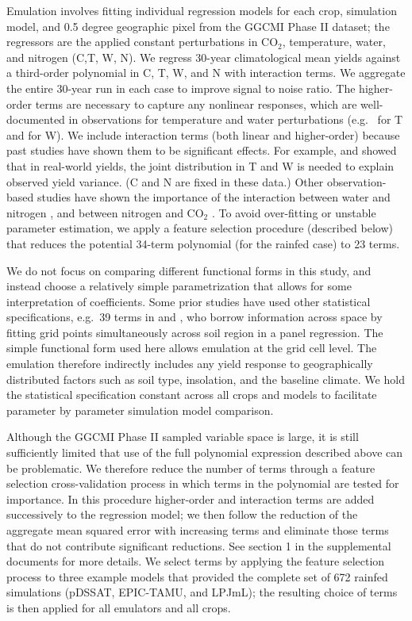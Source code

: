 \documentclass[esd, manuscript]{copernicus} %
\begin{document}
Emulation involves fitting individual regression models for each crop, simulation model, and 0.5 degree geographic pixel from the GGCMI Phase II dataset; the regressors are the applied constant perturbations in CO$_2$, temperature, water, and nitrogen (C,T, W, N).  We regress 30-year climatological mean yields against a third-order polynomial in C, T, W, and N with interaction terms. We aggregate the entire 30-year run in each case to improve signal to noise ratio. The higher-order terms are necessary to capture any nonlinear responses, which are well-documented in observations for temperature and water perturbations (e.g.\ \citet{Schlenker2009} for T and \citet{He2016} for W). We include interaction terms (both linear and higher-order) because past studies have shown them to be significant effects. For example, \citet{Lobell2007} and \citet{Tebaldi2008} showed that in real-world yields, the joint distribution in T and W is needed to explain observed yield variance. (C and N are fixed in these data.) Other observation-based studies have shown the importance of the interaction between water and nitrogen \citep[e.g.][]{AULAKH2005}, and between nitrogen and CO$_2$ \citep{Mitsuru92, Nakamura97}. To avoid over-fitting or unstable parameter estimation, we apply a feature selection procedure (described below) that reduces the potential 34-term polynomial (for the rainfed case) to 23 terms.

We do not focus on comparing different functional forms in this study, and instead choose a relatively simple parametrization that allows for some interpretation of coefficients. Some prior studies have used other statistical specifications, e.g.\ 39 terms in \citet{BLANC2015} and \citet{BLANC2017}, who borrow information across space by fitting grid points simultaneously across soil region in a panel regression. The simple functional form used here allows emulation at the grid cell level. The emulation therefore indirectly includes any yield response to geographically distributed factors such as soil type, insolation, and the baseline climate. We hold the statistical specification constant across all crops and models to facilitate parameter by parameter simulation model comparison.

Although the GGCMI Phase II sampled variable space is large, it is still sufficiently limited that use of the full polynomial expression described above can be problematic. We therefore reduce the number of terms through a feature selection cross-validation process in which terms in the polynomial are tested for importance. In this procedure higher-order and interaction terms are added successively to the regression model; we then follow the reduction of the aggregate mean squared error with increasing terms and eliminate those terms that do not contribute significant reductions. See section 1 in the supplemental documents for more details. We select terms by applying the feature selection process to three example models that provided the complete set of 672 rainfed simulations (pDSSAT, EPIC-TAMU, and LPJmL); the resulting choice of terms is then applied for all emulators and all crops.
\end{document}
